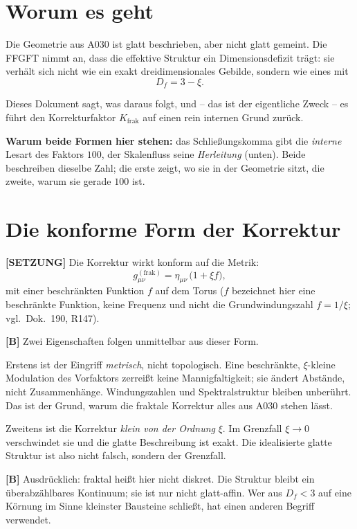 \section{Worum es geht}

Die Geometrie aus A030 ist glatt beschrieben, aber nicht glatt gemeint. Die
FFGFT nimmt an, dass die effektive Struktur ein Dimensionsdefizit trägt: sie
verhält sich nicht wie ein exakt dreidimensionales Gebilde, sondern wie eines
mit
\[
  D_f = 3 - \xi .
\]

Dieses Dokument sagt, was daraus folgt, und -- das ist der eigentliche Zweck --
es führt den Korrekturfaktor $K_\text{frak}$ auf einen rein internen Grund
zurück.

\textbf{Warum beide Formen hier stehen:} das Schließungskomma gibt die
\emph{interne} Lesart des Faktors $100$, der Skalenfluss seine \emph{Herleitung} (unten). Beide beschreiben dieselbe Zahl; die erste zeigt, wo sie in
der Geometrie sitzt, die zweite, warum sie gerade $100$ ist.

\section{Die konforme Form der Korrektur}

\textbf{[SETZUNG]} Die Korrektur wirkt konform auf die Metrik:
\[
  g_{\mu\nu}^{(\text{frak})} = \eta_{\mu\nu}\,\bigl(1 + \xi f\bigr),
\]
mit einer beschränkten Funktion $f$ auf dem Torus ($f$ bezeichnet hier eine
beschränkte Funktion, keine Frequenz und nicht die Grundwindungszahl $f=1/\xi$;
vgl.\ Dok.~190, R147).

\textbf{[B]} Zwei Eigenschaften folgen unmittelbar aus dieser Form.

Erstens ist der Eingriff \emph{metrisch}, nicht topologisch. Eine beschränkte,
$\xi$-kleine Modulation des Vorfaktors zerreißt keine Mannigfaltigkeit; sie
ändert Abstände, nicht Zusammenhänge. Windungszahlen und Spektralstruktur
bleiben unberührt. Das ist der Grund, warum die fraktale Korrektur alles aus
A030 stehen lässt.

Zweitens ist die Korrektur \emph{klein von der Ordnung} $\xi$. Im Grenzfall
$\xi\to 0$ verschwindet sie und die glatte Beschreibung ist exakt. Die
idealisierte glatte Struktur ist also nicht falsch, sondern der Grenzfall.

\textbf{[B]} Ausdrücklich: fraktal heißt hier nicht diskret. Die Struktur bleibt
ein überabzählbares Kontinuum; sie ist nur nicht glatt-affin. Wer aus $D_f<3$
auf eine Körnung im Sinne kleinster Bausteine schließt, hat einen anderen
Begriff verwendet.

